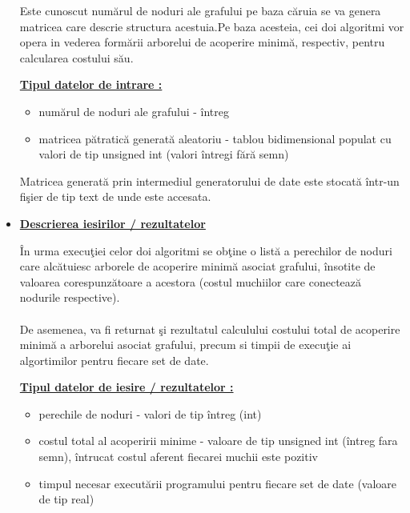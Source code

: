 \documentclass[14pt]{article}
\begin{document}
\begin{itemize}
Este cunoscut num\u{a}rul de noduri ale grafului pe baza c\u{a}ruia se va genera matricea care descrie structura acestuia.Pe baza acesteia, cei doi algoritmi vor opera in vederea form\u{a}rii arborelui de acoperire minim\u{a}, respectiv, pentru calcularea costului s\u{a}u.
\newpage

\underline{\textbf{Tipul datelor de intrare :}}\\
\begin{itemize}
    \item 
    num\u{a}rul de noduri ale grafului - \^intreg
    \item
    matricea p\u{a}tratic\u{a} generat\u{a} aleatoriu - tablou bidimensional populat cu valori de tip unsigned int (valori \^intregi f\u{a}r\u{a} semn) 
\end{itemize}

Matricea generat\u{a} prin intermediul generatorului de date este stocat\u{a} \^intr-un fi\c sier de tip text de unde este accesata. 

\vspace{2mm}

\item
\underline{\Large\textbf{Descrierea iesirilor / rezultatelor}}

\vspace{3mm}

\^In urma execu\c tiei celor doi algoritmi se ob\c tine o list\u{a} a perechilor de noduri care alc\u{a}tuiesc arborele de acoperire minim\u{a} asociat grafului, \^insotite de valoarea corespunz\u{a}toare a acestora (costul muchiilor care conecteaz\u{a} nodurile respective).\\
\\
De asemenea, va fi returnat \c si rezultatul calculului costului total de acoperire minim\u{a} a arborelui asociat grafului, precum si timpii de execu\c tie ai algortimilor pentru fiecare set de date.  

\vspace{3mm}

\underline{\textbf{Tipul datelor de iesire / rezultatelor :}}
\vspace{2mm}

\begin{itemize}
    \item perechile de noduri - valori de tip \^intreg (int)
    \item costul total al acoperirii minime - valoare de tip unsigned int (\^intreg fara semn), \^intrucat costul aferent fiecarei muchii este pozitiv
    \item timpul necesar execut\u{a}rii programului pentru fiecare set de date (valoare de tip real)
\end{itemize}


\end{itemize}
\end{document}
